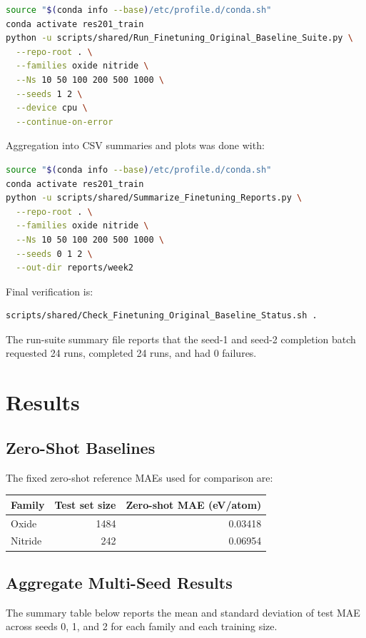 \documentclass[11pt]{article}
\begin{document}
\begin{lstlisting}[language=bash]
source "$(conda info --base)/etc/profile.d/conda.sh"
conda activate res201_train
python -u scripts/shared/Run_Finetuning_Original_Baseline_Suite.py \
  --repo-root . \
  --families oxide nitride \
  --Ns 10 50 100 200 500 1000 \
  --seeds 1 2 \
  --device cpu \
  --continue-on-error
\end{lstlisting}

Aggregation into CSV summaries and plots was done with:

\begin{lstlisting}[language=bash]
source "$(conda info --base)/etc/profile.d/conda.sh"
conda activate res201_train
python -u scripts/shared/Summarize_Finetuning_Reports.py \
  --repo-root . \
  --families oxide nitride \
  --Ns 10 50 100 200 500 1000 \
  --seeds 0 1 2 \
  --out-dir reports/week2
\end{lstlisting}

Final verification is:

\begin{lstlisting}[language=bash]
scripts/shared/Check_Finetuning_Original_Baseline_Status.sh .
\end{lstlisting}

The run-suite summary file reports that the seed-1 and seed-2 completion batch requested 24 runs, completed 24 runs, and had 0 failures.

\section{Results}
\subsection{Zero-Shot Baselines}
The fixed zero-shot reference MAEs used for comparison are:

\begin{center}
\begin{tabular}{lrr}
\toprule
Family & Test set size & Zero-shot MAE (eV/atom) \\
\midrule
Oxide   & 1484 & 0.03418 \\
Nitride &  242 & 0.06954 \\
\bottomrule
\end{tabular}
\end{center}

\subsection{Aggregate Multi-Seed Results}
The summary table below reports the mean and standard deviation of test MAE across seeds 0, 1, and 2 for each family and each training size.
\end{document}
